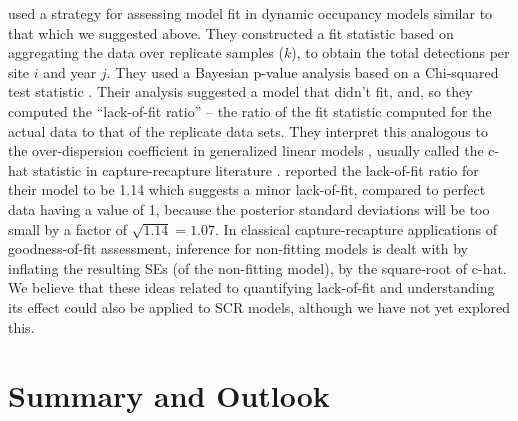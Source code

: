 \citet{kery_etal:inreview} used a strategy for assessing model
fit in dynamic occupancy models \citep{royle_kery:2007} similar to that which we suggested above.
They constructed a fit statistic based on aggregating the data over
replicate samples ($k$), to obtain the total detections per site $i$
and year $j$.  They used a Bayesian p-value analysis based on a
Chi-squared test statistic \citep[also
see][Chapt. 12]{kery_schaub:2011}.  Their analysis suggested a model
that didn't fit, and, so they computed the ``lack-of-fit ratio''
\cite[see][Sec. 12.3]{kery_schaub:2011} -- the ratio of the fit
statistic computed for the actual data to that of the replicate data
sets.  They interpret this analogous to the over-dispersion coefficient
in generalized linear models \citep{mccullagh_nelder:1989}, usually
called the c-hat statistic in capture-recapture literature
\citep[see][Chapt. 5]{cooch_white:2006}.  \citet{kery_etal:inreview}
reported the lack-of-fit ratio for their model to be 1.14 which
suggests a minor lack-of-fit, compared to perfect data having a value
of 1, because the posterior standard deviations will be too small by a
factor of $\sqrt{1.14} = 1.07$.
In classical capture-recapture
applications of goodness-of-fit assessment, inference for non-fitting
models is dealt with by inflating the resulting SEs (of the non-fitting model),
by the square-root of c-hat. 
We believe that these ideas related to quantifying lack-of-fit and
understanding its effect could also be applied to SCR models, although
we have not yet explored this. 


\begin{comment}
actually, we used that idea of quantifying the degree of lack of fit using some c-hat-like statistic in the BPA book in the comparison of the series of Nmix models in section 12.3. (p. 396 and later). We call this a "lack of fit ratio": e.g., p. 401 in the middle, and then later on p. 404 and 407. I think that this makes sense intuitively, but I wonder whether there is some more theoretical foundation for it ?
\end{comment}


\section{ Summary and Outlook  }



